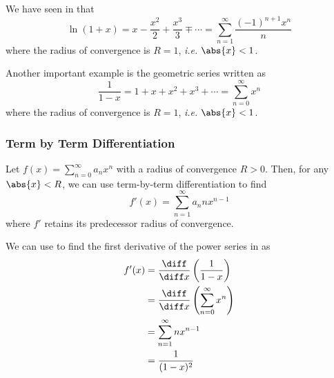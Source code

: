 \begin{exm}\label{exm-power-series-converges-to-taylor:3}
	We have seen in  that
	\begin{equation*}
		\ln(1+x) = x - \frac{x^2}{2} + \frac{x^3}{3} \mp \cdots = \sum_{n=1}^\infty \frac{(-1)^{n+1} x^n}{n}
	\end{equation*}
	where the radius of convergence is $R=1$, \textit{i.e.} $\abs{x}<1$.
\end{exm}

\begin{exm}\label{exm-power-series-converges-to-taylor:4}
	Another important example is the geometric series written as
	\begin{equation*}
		\frac{1}{1-x} = 1 + x + x^2 + x^3 + \cdots = \sum_{n=0}^\infty x^n
	\end{equation*}
	where the radius of convergence is $R=1$, \textit{i.e.} $\abs{x}<1$.
\end{exm}

\subsubsection{Term by Term Differentiation}\label{subsubsec-term-by-term-differentiation}

\begin{thm}\label{thm-term-by-term-differentiation}
	Let $f(x)=\sum_{n=0}^\infty a_n x^n$ with a radius of convergence $R>0$. Then,
	for any $\abs{x}<R$, we can use term-by-term differentiation to find
	\begin{equation}\label{eq-term-by-term-differentiation}
		f'(x) = \sum_{n=1}^\infty a_n nx^{n-1}
	\end{equation}
	where $f'$ retains its predecessor radius of convergence.
\end{thm}

\begin{exm}\label{exm-term-by-term-differentiation:1}
	We can use  to find the first
	derivative of the power series in  as
	\begin{align*}
		f'(x) & = \frac{\diff}{\diff x}\left(\frac{1}{1-x}\right)         \\
		      & = \frac{\diff}{\diff x}\left(\sum_{n=0}^\infty x^n\right) \\
		      & = \sum_{n=1}^\infty nx^{n-1}                              \\
		      & = \frac{1}{(1-x)^2}
	\end{align*}
\end{exm}

